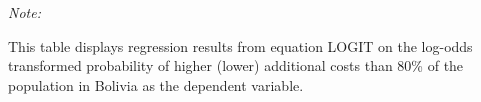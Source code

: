 \begin{table}[htbp!]
\begin{adjustbox}{width = 1\textwidth, max height = 0.95\textheight, center}
\begin{threeparttable}[b]
         \begin{tablenotes}\item \medskip \textit{Note:}
            \item This table displays regression results from equation LOGIT on the log-odds transformed probability of higher (lower) additional costs than 80\% of the population in Bolivia as the dependent variable. 
         \end{tablenotes}
      \end{threeparttable}
   \end{adjustbox}
\end{table}


